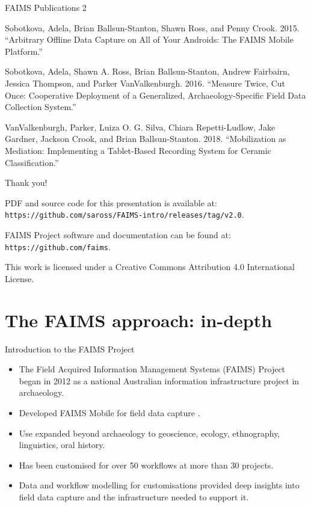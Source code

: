 \documentclass[aspectratio=169, 12pt]{beamer} %
\begin{document}
\begin{frame}{FAIMS Publications 2}
\begin{itemize}[label=\textbullet]
{\small
    \item Sobotkova, Adela, Brian Ballsun-Stanton, Shawn Ross, and Penny Crook. 2015. ``Arbitrary Offline Data Capture on All of Your Androids: The FAIMS Mobile Platform.''
\item Sobotkova, Adela, Shawn A. Ross, Brian Ballsun-Stanton, Andrew Fairbairn, Jessica Thompson, and Parker VanValkenburgh. 2016. ``Measure Twice, Cut Once: Cooperative Deployment of a Generalized, Archaeology-Specific Field Data Collection System.'' 
\item VanValkenburgh, Parker, Luiza O. G. Silva, Chiara Repetti-Ludlow, Jake Gardner, Jackson Crook, and Brian Ballsun-Stanton. 2018. ``Mobilization as Mediation: Implementing a Tablet-Based Recording System for Ceramic Classification.''} 
\end{itemize}
    
\end{frame}
\begin{frame}{Thank you!}


PDF and source code for this presentation is available at: 
\texttt{https://github.com/saross/FAIMS-intro/releases/tag/v2.0}.

FAIMS Project software and documentation can be found at:
\texttt{https://github.com/faims}.

This work is licensed under a Creative Commons Attribution 4.0 International License.

\end{frame}

\section{The FAIMS approach: in-depth}

\begin{frame}{Introduction to the FAIMS Project}
    \begin{itemize}[label=\textbullet]
        \item The Field Acquired Information Management Systems (FAIMS) Project began in 2012 as a national Australian information infrastructure project in archaeology.
        \item Developed FAIMS Mobile for field data capture \cite{Ballsun-Stanton2018-zd}.
        \item Use expanded beyond archaeology to geoscience, ecology, ethnography, linguistics, oral history.
        \item Has been customised for over 50 workflows at more than 30 projects. 
        \item Data and workflow modelling for customisations provided deep insights into field data capture and the infrastructure needed to support it.
    \end{itemize}
\end{frame}
\end{document}
